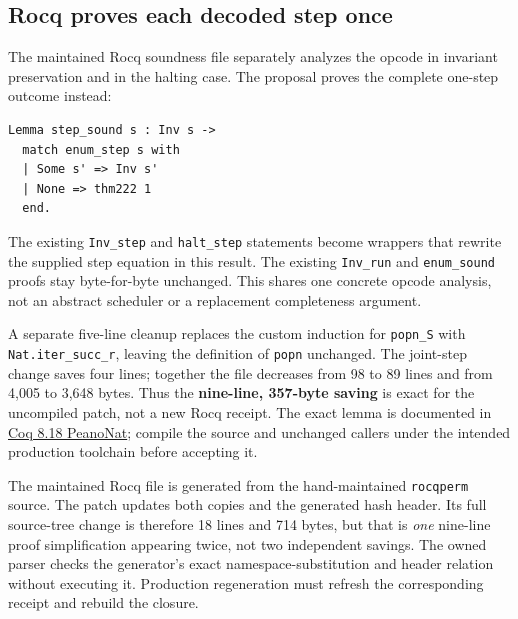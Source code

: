 \documentclass[11pt]{article}
\newcommand{\code}[1]{\texttt{#1}}
\begin{document}
\begin{samepage}
\subsection{Rocq proves each decoded step once}
The maintained Rocq soundness file separately analyzes the opcode in invariant preservation and in the halting case. The proposal proves the complete one-step outcome instead:
\begin{verbatim}
Lemma step_sound s : Inv s ->
  match enum_step s with
  | Some s' => Inv s'
  | None => thm222 1
  end.
\end{verbatim}
\end{samepage}
The existing \code{Inv\_step} and \code{halt\_step} statements become wrappers that rewrite the supplied step equation in this result. The existing \code{Inv\_run} and \code{enum\_sound} proofs stay byte-for-byte unchanged. This shares one concrete opcode analysis, not an abstract scheduler or a replacement completeness argument.

A separate five-line cleanup replaces the custom induction for \code{popn\_S} with \code{Nat.iter\_succ\_r}, leaving the definition of \code{popn} unchanged. The joint-step change saves four lines; together the file decreases from 98 to 89 lines and from 4,005 to 3,648 bytes. Thus the \textbf{nine-line, 357-byte saving} is exact for the uncompiled patch, not a new Rocq receipt. The exact lemma is documented in \href{https://rocq-prover.org/doc/V8.18.0/stdlib/Coq.Arith.PeanoNat.html#Nat.iter_succ_r}{Coq 8.18 PeanoNat}; compile the source and unchanged callers under the intended production toolchain before accepting it.

The maintained Rocq file is generated from the hand-maintained \code{rocqperm} source. The patch updates both copies and the generated hash header. Its full source-tree change is therefore 18 lines and 714 bytes, but that is \emph{one} nine-line proof simplification appearing twice, not two independent savings. The owned parser checks the generator's exact namespace-substitution and header relation without executing it. Production regeneration must refresh the corresponding receipt and rebuild the closure.
\end{document}
